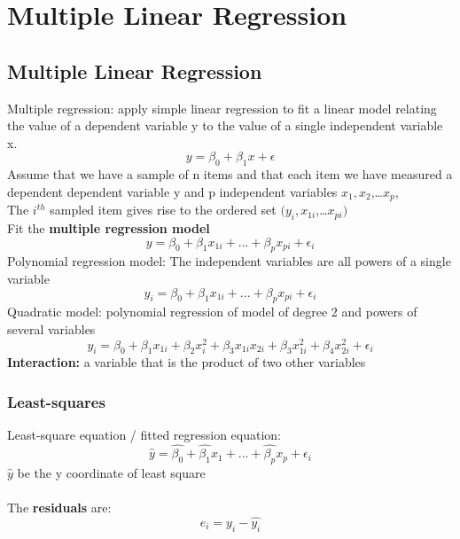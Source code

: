 \documentclass[../main.tex]{subfiles}
\begin{document}
\section{Multiple Linear Regression}

\subsection*{Multiple Linear Regression}
Multiple regression: apply simple linear regression to fit a linear model relating the value of a dependent variable y to the value of a single independent variable x.
\begin{equation*}
    y=\beta_0+\beta_1 x+\epsilon
\end{equation*}
Assume that we have a sample of n items and that each item we have measured a dependent dependent variable y and p independent variables $x_1,x_2$,…$x_p$,\\
The $i^{t h}$ sampled item gives rise to the ordered set $(y_i,x_{1i}$,…$x_{pi})$\\
Fit the \textbf{multiple regression model}
\begin{equation*}
y  ={\beta_0}+{\beta_1}x_{1i}+...+{\beta_p}x_{pi}+\epsilon _i
\end{equation*}
Polynomial regression model: The independent variables are all powers of a single variable
\begin{equation*}
y_i={\beta_0}+{\beta_1}x_{1i}+...+{\beta_p}x_{pi}+\epsilon _i
\end{equation*}
Quadratic model: polynomial regression of model of degree 2 and powers of several variables
\begin{equation*}
y_i={\beta_0}+{\beta_1}x_{1i}+\beta_2x_i^2+\beta_3 x_{1i} x_{2i} +\beta_3 x_{1i}^2+\beta_4 x_{2i}^2+\epsilon _i
\end{equation*}
\textbf{Interaction:} a variable that is the product of two other variables

\subsubsection*{Least-squares}
Least-square equation / fitted regression equation: 
\begin{equation*}
\hat y  =\hat{\beta_0}+\hat{\beta_1}x_1+...+\hat{\beta_p}x_p+\epsilon _i
\end{equation*}
$\hat{y}$ be the y coordinate of least square\\
\\
The \textbf{residuals} are: $$e_i= y_i-\hat{y_i}$$
\end{document}
